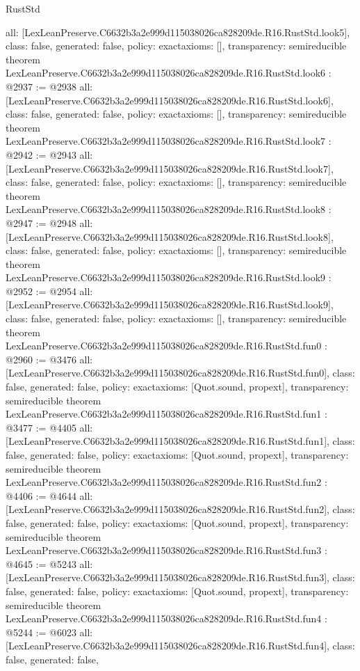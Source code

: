 \begin{lexlean}{RustStd}
\begin{coremodule}
{  all: [LexLeanPreserve.C6632b3a2e999d115038026ca828209de.R16.RustStd.look5],
  class: false,
  generated: false,
  policy: exact{axioms: []},
  transparency: semireducible
}
theorem LexLeanPreserve.C6632b3a2e999d115038026ca828209de.R16.RustStd.look6 : @2937 := @2938 {
  all: [LexLeanPreserve.C6632b3a2e999d115038026ca828209de.R16.RustStd.look6],
  class: false,
  generated: false,
  policy: exact{axioms: []},
  transparency: semireducible
}
theorem LexLeanPreserve.C6632b3a2e999d115038026ca828209de.R16.RustStd.look7 : @2942 := @2943 {
  all: [LexLeanPreserve.C6632b3a2e999d115038026ca828209de.R16.RustStd.look7],
  class: false,
  generated: false,
  policy: exact{axioms: []},
  transparency: semireducible
}
theorem LexLeanPreserve.C6632b3a2e999d115038026ca828209de.R16.RustStd.look8 : @2947 := @2948 {
  all: [LexLeanPreserve.C6632b3a2e999d115038026ca828209de.R16.RustStd.look8],
  class: false,
  generated: false,
  policy: exact{axioms: []},
  transparency: semireducible
}
theorem LexLeanPreserve.C6632b3a2e999d115038026ca828209de.R16.RustStd.look9 : @2952 := @2954 {
  all: [LexLeanPreserve.C6632b3a2e999d115038026ca828209de.R16.RustStd.look9],
  class: false,
  generated: false,
  policy: exact{axioms: []},
  transparency: semireducible
}
theorem LexLeanPreserve.C6632b3a2e999d115038026ca828209de.R16.RustStd.fun0 : @2960 := @3476 {
  all: [LexLeanPreserve.C6632b3a2e999d115038026ca828209de.R16.RustStd.fun0],
  class: false,
  generated: false,
  policy: exact{axioms: [Quot.sound, propext]},
  transparency: semireducible
}
theorem LexLeanPreserve.C6632b3a2e999d115038026ca828209de.R16.RustStd.fun1 : @3477 := @4405 {
  all: [LexLeanPreserve.C6632b3a2e999d115038026ca828209de.R16.RustStd.fun1],
  class: false,
  generated: false,
  policy: exact{axioms: [Quot.sound, propext]},
  transparency: semireducible
}
theorem LexLeanPreserve.C6632b3a2e999d115038026ca828209de.R16.RustStd.fun2 : @4406 := @4644 {
  all: [LexLeanPreserve.C6632b3a2e999d115038026ca828209de.R16.RustStd.fun2],
  class: false,
  generated: false,
  policy: exact{axioms: [Quot.sound, propext]},
  transparency: semireducible
}
theorem LexLeanPreserve.C6632b3a2e999d115038026ca828209de.R16.RustStd.fun3 : @4645 := @5243 {
  all: [LexLeanPreserve.C6632b3a2e999d115038026ca828209de.R16.RustStd.fun3],
  class: false,
  generated: false,
  policy: exact{axioms: [Quot.sound, propext]},
  transparency: semireducible
}
theorem LexLeanPreserve.C6632b3a2e999d115038026ca828209de.R16.RustStd.fun4 : @5244 := @6023 {
  all: [LexLeanPreserve.C6632b3a2e999d115038026ca828209de.R16.RustStd.fun4],
  class: false,
  generated: false,
}
\end{coremodule}
\end{lexlean}
